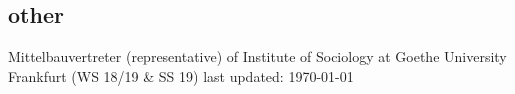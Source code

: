 \documentclass[11pt, a4paper]{article}
\newcommand{\years}[1]{\marginnote{~~#1}}
\begin{document}
\subsection*{other}
Mittelbauvertreter (representative) of Institute of Sociology at Goethe University Frankfurt (WS 18/19 \& SS 19)
\vfill{}
last updated: \today
\end{document}
